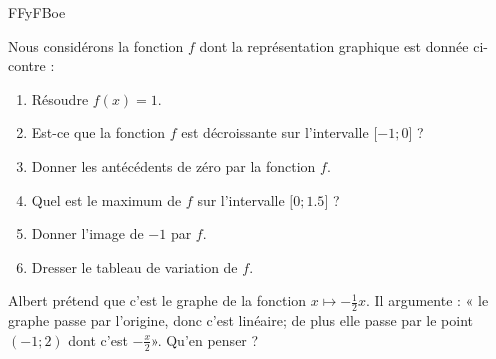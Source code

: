 
\begin{exercice}\label{exosmath-0570}

FFyFBoe

    Nous considérons la fonction \( f\) dont la représentation graphique est donnée ci-contre :

    \begin{enumerate}
        \item
            Résoudre \( f(x)=1\).
        \item
            Est-ce que la fonction \( f\) est décroissante sur l'intervalle \( \mathopen[ -1 ;0 \mathclose]\) ?
        \item
            Donner les antécédents de zéro par la fonction \( f\).
        \item
            Quel est le maximum de \( f\) sur l'intervalle \( \mathopen[ 0 ;1.5 \mathclose]\) ?
        \item 
            Donner l'image de \( -1\) par \( f\).
        \item
            Dresser le tableau de variation de \( f\).
    \end{enumerate}
        Albert prétend que c'est le graphe de la fonction \( x\mapsto -\frac{ 1 }{2}x\). Il argumente : « le graphe passe par l'origine, donc c'est linéaire; de plus elle passe par le point \( (-1;2)\) dont c'est \( -\frac{ x }{2}\)». Qu'en penser ?


\end{exercice}

